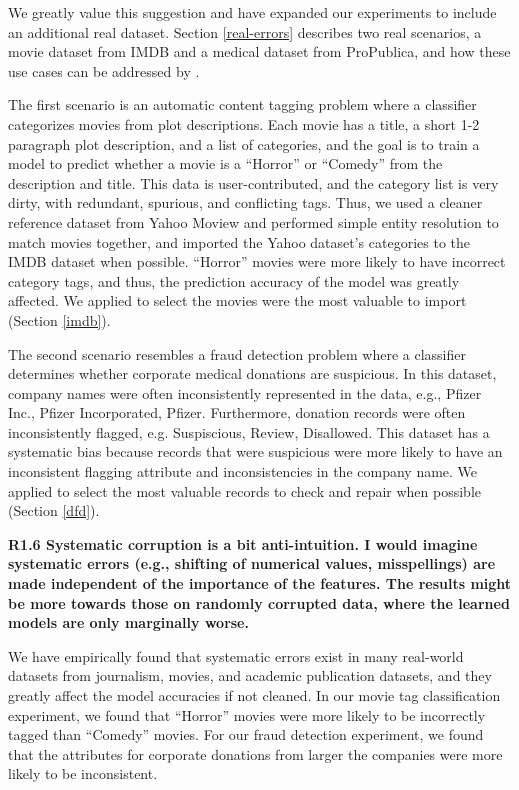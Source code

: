 \noindent We greatly value this suggestion and have expanded our experiments to include an additional real dataset.
Section \ref{real-errors} describes two real scenarios, a movie dataset from IMDB and a medical dataset from ProPublica, and how these use cases can be addressed by \sys.

The first scenario is an automatic content tagging problem where a classifier categorizes movies from plot descriptions.
Each movie has a title, a short 1-2 paragraph plot description, and a list of categories, and the goal is to train a model to predict whether a movie is a ``Horror'' or ``Comedy'' from the description and title. 
This data is user-contributed, and the category list is very dirty, with redundant, spurious, and conflicting tags.  
Thus, we used a cleaner reference dataset from Yahoo Moview and performed simple entity resolution to match movies together, and imported the Yahoo dataset's categories to the IMDB dataset when possible.
``Horror'' movies were more likely to have incorrect category tags, and thus, the prediction accuracy of the model was greatly affected. 
We applied \sys to select the movies were the most valuable to import (Section \ref{imdb}). 

The second scenario resembles a fraud detection problem where a classifier determines whether corporate medical donations are suspicious.
In this dataset, company names were often inconsistently represented in the data, e.g., Pfizer Inc., Pfizer Incorporated, Pfizer.
Furthermore, donation records were often inconsistently flagged, e.g. Suspiscious, Review, Disallowed.
This dataset has a systematic bias because records that were suspicious were more likely to have an inconsistent flagging attribute and inconsistencies in the company name.
We applied \sys to select the most valuable records to check and repair when possible (Section \ref{dfd}). 

\vspace{0.5em}

\noindent\textbf{R1.6 Systematic corruption is a bit anti-intuition. I would imagine systematic errors (e.g., shifting of numerical values, misspellings) are made independent of the importance of the features. The results might be more towards those on randomly corrupted data, where the learned models are only marginally worse.}

\noindent  We have empirically found that systematic errors exist in many real-world datasets from journalism, movies, and academic publication datasets, and they greatly affect the model accuracies if not cleaned. In our movie tag classification experiment, we found that ``Horror'' movies were more likely to be incorrectly tagged than ``Comedy'' movies.
For our fraud detection experiment, we found that the attributes for corporate donations from larger the companies were more likely to be inconsistent.


